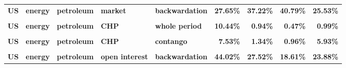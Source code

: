 \documentclass[
  authoryear,
  preprint,
  3p]{elsarticle}
\begin{document}
\begin{landscape}
\begin{longtable}[t]{>{}l>{}l>{}l>{}l>{}l>{}r>{}r>{}r>{}r}
\textbf{US} & \textbf{energy} & \textbf{petroleum} & \textbf{market} & \textbf{backwardation} & \textcolor[HTML]{4285f4}{\textbf{27.65\%}} & \textcolor[HTML]{4285f4}{\textbf{37.22\%}} & \textcolor[HTML]{4285f4}{\textbf{40.79\%}} & \textcolor[HTML]{4285f4}{\textbf{25.53\%}}\\
\textbf{\cellcolor{gray!10}{US}} & \textbf{\cellcolor{gray!10}{energy}} & \textbf{\cellcolor{gray!10}{petroleum}} & \textbf{\cellcolor{gray!10}{market}} & \textbf{\cellcolor{gray!10}{contango}} & \textcolor[HTML]{4285f4}{\textbf{\cellcolor{gray!10}{30.08\%}}} & \textcolor[HTML]{4285f4}{\textbf{\cellcolor{gray!10}{35.26\%}}} & \textcolor[HTML]{4285f4}{\textbf{\cellcolor{gray!10}{52.9\%}}} & \textcolor[HTML]{4285f4}{\textbf{\cellcolor{gray!10}{35.71\%}}}\\
\textbf{US} & \textbf{energy} & \textbf{petroleum} & \textbf{CHP} & \textbf{whole period} & \textcolor[HTML]{4285f4}{\textbf{10.44\%}} & \textcolor[HTML]{4285f4}{\textbf{0.94\%}} & \textcolor[HTML]{4285f4}{\textbf{0.47\%}} & \textcolor[HTML]{4285f4}{\textbf{0.99\%}}\\
\addlinespace
\textbf{\cellcolor{gray!10}{US}} & \textbf{\cellcolor{gray!10}{energy}} & \textbf{\cellcolor{gray!10}{petroleum}} & \textbf{\cellcolor{gray!10}{CHP}} & \textbf{\cellcolor{gray!10}{backwardation}} & \textcolor[HTML]{4285f4}{\textbf{\cellcolor{gray!10}{13.69\%}}} & \textcolor[HTML]{4285f4}{\textbf{\cellcolor{gray!10}{0.63\%}}} & \textcolor[HTML]{4285f4}{\textbf{\cellcolor{gray!10}{0.15\%}}} & \textcolor[HTML]{4285f4}{\textbf{\cellcolor{gray!10}{1.14\%}}}\\
\textbf{US} & \textbf{energy} & \textbf{petroleum} & \textbf{CHP} & \textbf{contango} & \textcolor[HTML]{4285f4}{\textbf{7.53\%}} & \textcolor[HTML]{4285f4}{\textbf{1.34\%}} & \textcolor[HTML]{4285f4}{\textbf{0.96\%}} & \textcolor[HTML]{4285f4}{\textbf{5.93\%}}\\
\textbf{\cellcolor{gray!10}{US}} & \textbf{\cellcolor{gray!10}{energy}} & \textbf{\cellcolor{gray!10}{petroleum}} & \textbf{\cellcolor{gray!10}{open interest}} & \textbf{\cellcolor{gray!10}{whole period}} & \textcolor[HTML]{4285f4}{\textbf{\cellcolor{gray!10}{45.97\%}}} & \textcolor[HTML]{4285f4}{\textbf{\cellcolor{gray!10}{35.46\%}}} & \textcolor[HTML]{4285f4}{\textbf{\cellcolor{gray!10}{23.06\%}}} & \textcolor[HTML]{4285f4}{\textbf{\cellcolor{gray!10}{31.56\%}}}\\
\textbf{US} & \textbf{energy} & \textbf{petroleum} & \textbf{open interest} & \textbf{backwardation} & \textcolor[HTML]{4285f4}{\textbf{44.02\%}} & \textcolor[HTML]{4285f4}{\textbf{27.52\%}} & \textcolor[HTML]{4285f4}{\textbf{18.61\%}} & \textcolor[HTML]{4285f4}{\textbf{23.88\%}}\\

\end{longtable}
\end{landscape}
\end{document}
